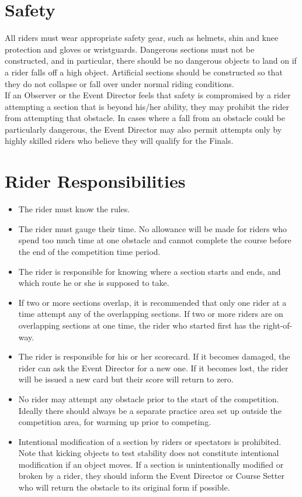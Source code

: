 \section{Safety}
All riders must wear appropriate safety gear, such as helmets, shin and knee protection and gloves or wristguards.
Dangerous sections must not be constructed, and in particular, there should be no dangerous objects to land on if a rider
falls off a high object. Artificial sections should be constructed so that they do not collapse or fall over under normal riding
conditions.\\
If an Observer or the Event Director feels that safety is compromised by a rider attempting a section that is beyond his/her
ability, they may prohibit the rider from attempting that obstacle. In cases where a fall from an obstacle could be
particularly dangerous, the Event Director may also permit attempts only by highly skilled riders who believe they will
qualify for the Finals.

\section{Rider Responsibilities}
\begin{itemize}
\item The rider must know the rules.
\item The rider must gauge their time. No allowance will be made for riders who spend too much time at one obstacle and
cannot complete the course before the end of the competition time period.
\item The rider is responsible for knowing where a section starts and ends, and which route he or she is supposed to take.
\item If two or more sections overlap, it is recommended that only one rider at a time attempt any of the overlapping
sections. If two or more riders are on overlapping sections at one time, the rider who started first has the right-of-
way.
\item The rider is responsible for his or her scorecard. If it becomes damaged, the rider can ask the Event Director for a
new one. If it becomes lost, the rider will be issued a new card but their score will return to zero.
\item No rider may attempt any obstacle prior to the start of the competition. Ideally there should always be a separate
practice area set up outside the competition area, for warming up prior to competing.
\item Intentional modification of a section by riders or spectators is prohibited. Note that kicking objects to test stability
does not constitute intentional modification if an object moves. If a section is unintentionally modified or broken by a
rider, they should inform the Event Director or Course Setter who will return the obstacle to its original form if
possible.
\end{itemize}

